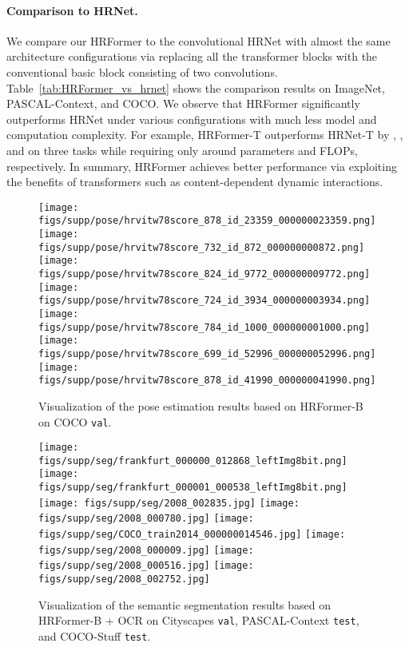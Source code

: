 \documentclass{article}
\begin{document}
\paragraph{Comparison to HRNet.}
We compare our HRFormer to the convolutional HRNet with almost the same architecture configurations
via replacing all the transformer blocks with the conventional basic block consisting
of two  convolutions.
Table~\ref{tab:HRFormer_vs_hrnet} shows the comparison results
on ImageNet, PASCAL-Context, and COCO.
We observe that
HRFormer significantly outperforms HRNet under various configurations
with much less model and computation complexity.
For example, HRFormer-T outperforms HRNet-T by , , and 
on three tasks while requiring only around  parameters and FLOPs, respectively.
In summary, HRFormer achieves better performance via
exploiting the benefits of transformers such as content-dependent dynamic interactions.


\begin{figure}[t]
  \centering
  \texttt{[image: figs/supp/pose/hrvitw78score\_878\_id\_23359\_000000023359.png]}
  \texttt{[image: figs/supp/pose/hrvitw78score\_732\_id\_872\_000000000872.png]}
  \texttt{[image: figs/supp/pose/hrvitw78score\_824\_id\_9772\_000000009772.png]}
  \texttt{[image: figs/supp/pose/hrvitw78score\_724\_id\_3934\_000000003934.png]}
  \\
  \vspace{1mm}
  \texttt{[image: figs/supp/pose/hrvitw78score\_784\_id\_1000\_000000001000.png]}
  \texttt{[image: figs/supp/pose/hrvitw78score\_699\_id\_52996\_000000052996.png]}
  \texttt{[image: figs/supp/pose/hrvitw78score\_878\_id\_41990\_000000041990.png]}
  \vspace{-0mm}
  \caption{{Visualization of the pose estimation results based on HRFormer-B on COCO  \texttt{val}.}}
  \label{fig:more_pose_example}
  \vspace{-0mm}
\end{figure}

\begin{figure}[hb]
  \centering
  \texttt{[image: figs/supp/seg/frankfurt\_000000\_012868\_leftImg8bit.png]}
  \texttt{[image: figs/supp/seg/frankfurt\_000001\_000538\_leftImg8bit.png]}
  \texttt{[image: figs/supp/seg/2008\_002835.jpg]}
  \texttt{[image: figs/supp/seg/2008\_000780.jpg]}
  \texttt{[image: figs/supp/seg/COCO\_train2014\_000000014546.jpg]}
  \texttt{[image: figs/supp/seg/2008\_000009.jpg]}
  \texttt{[image: figs/supp/seg/2008\_000516.jpg]}
  \texttt{[image: figs/supp/seg/2008\_002752.jpg]}\\
  \caption{{Visualization of the semantic segmentation results based on HRFormer-B + OCR on Cityscapes \texttt{val}, PASCAL-Context \texttt{test}, and COCO-Stuff \texttt{test}.}}
  \label{fig:more_seg_example}
  \vspace{-0mm}
\end{figure}
\end{document}
